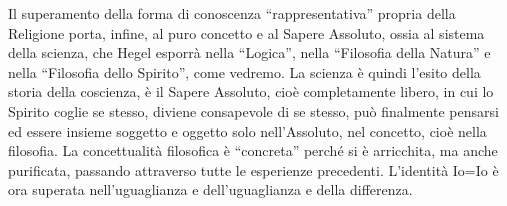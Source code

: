 \documentclass[a4paper,12pt,oneside,openany]{book}%
\begin{document}
Il superamento della forma di conoscenza “rappresentativa” propria della Religione porta, infine, al puro concetto e al Sapere Assoluto, ossia al sistema della scienza, che Hegel esporrà nella “Logica”, nella “Filosofia della Natura” e nella “Filosofia dello Spirito”, come vedremo. La scienza è quindi l’esito della storia della coscienza, è il Sapere Assoluto, cioè completamente libero, in cui lo Spirito coglie se stesso, diviene consapevole di se stesso, può finalmente pensarsi ed essere insieme soggetto e oggetto solo nell’Assoluto, nel concetto, cioè nella filosofia. La concettualità filosofica è “concreta” perché si è arricchita, ma anche purificata, passando attraverso tutte le esperienze precedenti. L’identità Io=Io è ora superata nell’uguaglianza e dell’uguaglianza e della differenza.

\newpage
	
	
	
	
	
	
\end{document}
